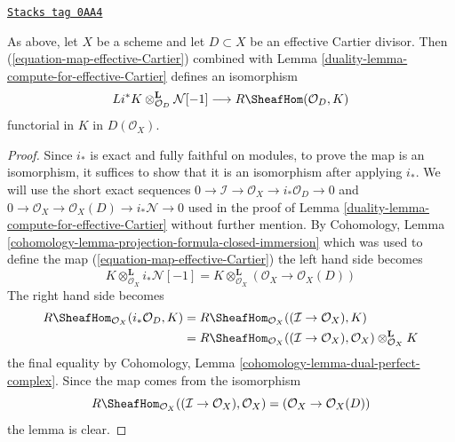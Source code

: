 \begin{lemma}
\label{duality-lemma-sheaf-with-exact-support-effective-Cartier}
\href{https://stacks.math.columbia.edu/tag/0AA4}{\texttt{Stacks tag 0AA4}}

As above, let $X$ be a scheme and let $D \subset X$ be an
effective Cartier divisor. Then (\ref{equation-map-effective-Cartier})
combined with Lemma \ref{duality-lemma-compute-for-effective-Cartier}
defines an isomorphism
$$
Li^*K \otimes_{\mathcal{O}_D}^\mathbf{L} \mathcal{N}[-1]
\longrightarrow
R\SheafHom(\mathcal{O}_D, K)
$$
functorial in $K$ in $D(\mathcal{O}_X)$.
\end{lemma}

\begin{proof}

Since $i_*$ is exact and fully faithful on modules, to prove the map is an
isomorphism, it suffices to show that it is an isomorphism after applying
$i_*$. We will use the short exact sequences
$0 \to \mathcal{I} \to \mathcal{O}_X \to i_*\mathcal{O}_D \to 0$
and
$0 \to \mathcal{O}_X \to \mathcal{O}_X(D) \to i_*\mathcal{N} \to 0$
used in the proof of Lemma \ref{duality-lemma-compute-for-effective-Cartier}
without further mention. By
Cohomology, Lemma \ref{cohomology-lemma-projection-formula-closed-immersion}
which was used to define the map (\ref{equation-map-effective-Cartier})
the left hand side becomes
$$
K \otimes_{\mathcal{O}_X}^\mathbf{L} i_*\mathcal{N}[-1] =
K \otimes_{\mathcal{O}_X}^\mathbf{L} (\mathcal{O}_X \to \mathcal{O}_X(D))
$$
The right hand side becomes
\begin{align*}
R\SheafHom_{\mathcal{O}_X}(i_*\mathcal{O}_D, K) & =
R\SheafHom_{\mathcal{O}_X}((\mathcal{I} \to \mathcal{O}_X), K) \\
& =
R\SheafHom_{\mathcal{O}_X}((\mathcal{I} \to \mathcal{O}_X), \mathcal{O}_X)
\otimes_{\mathcal{O}_X}^\mathbf{L} K
\end{align*}
the final equality by
Cohomology, Lemma \ref{cohomology-lemma-dual-perfect-complex}.
Since the map comes from the isomorphism
$$
R\SheafHom_{\mathcal{O}_X}((\mathcal{I} \to \mathcal{O}_X), \mathcal{O}_X)
= (\mathcal{O}_X \to \mathcal{O}_X(D))
$$
the lemma is clear.
\end{proof}

